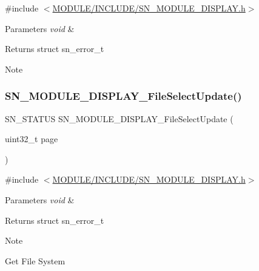 {\ttfamily \#include $<$\hyperlink{SN__MODULE__DISPLAY_8h}{M\+O\+D\+U\+L\+E/\+I\+N\+C\+L\+U\+D\+E/\+S\+N\+\_\+\+M\+O\+D\+U\+L\+E\+\_\+\+D\+I\+S\+P\+L\+A\+Y.\+h}$>$}


\begin{DoxyParams}{Parameters}
{\em void} & \\
\hline
\end{DoxyParams}
\begin{DoxyReturn}{Returns}
struct sn\+\_\+error\+\_\+t 
\end{DoxyReturn}
\begin{DoxyNote}{Note}

\end{DoxyNote}
\mbox{\label{group__DISPLAY_gabbde75c3e1a0fe4ffc14492a4e42931b}} 
\subsubsection{\texorpdfstring{S\+N\+\_\+\+M\+O\+D\+U\+L\+E\+\_\+\+D\+I\+S\+P\+L\+A\+Y\+\_\+\+File\+Select\+Update()}{SN\_MODULE\_DISPLAY\_FileSelectUpdate()}}
{\footnotesize\ttfamily S\+N\+\_\+\+S\+T\+A\+T\+US S\+N\+\_\+\+M\+O\+D\+U\+L\+E\+\_\+\+D\+I\+S\+P\+L\+A\+Y\+\_\+\+File\+Select\+Update (\begin{DoxyParamCaption}\item[{uint32\+\_\+t}]{page }\end{DoxyParamCaption})}



{\ttfamily \#include $<$\hyperlink{SN__MODULE__DISPLAY_8h}{M\+O\+D\+U\+L\+E/\+I\+N\+C\+L\+U\+D\+E/\+S\+N\+\_\+\+M\+O\+D\+U\+L\+E\+\_\+\+D\+I\+S\+P\+L\+A\+Y.\+h}$>$}


\begin{DoxyParams}{Parameters}
{\em void} & \\
\hline
\end{DoxyParams}
\begin{DoxyReturn}{Returns}
struct sn\+\_\+error\+\_\+t 
\end{DoxyReturn}
\begin{DoxyNote}{Note}

\end{DoxyNote}
Get File System

